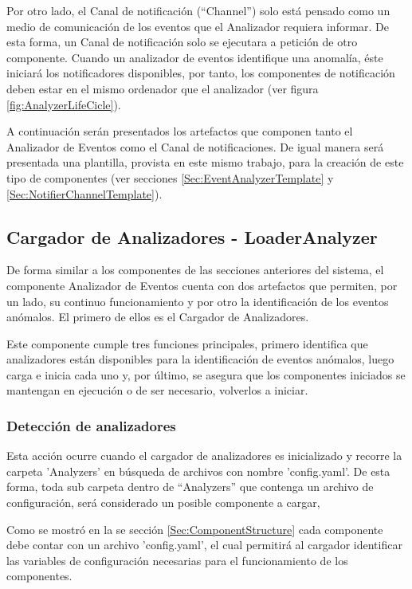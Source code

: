     Por otro lado, el Canal de notificación (``Channel'') solo está pensado como un medio de comunicación de los eventos que el Analizador requiera informar. De esta forma, un Canal de notificación solo se ejecutara a petición de otro componente. Cuando un analizador de eventos identifique una anomalía, éste iniciará los notificadores disponibles, por tanto, los componentes de notificación deben estar en el mismo ordenador que el analizador (ver figura \ref{fig:AnalyzerLifeCicle}).
    
    A continuación serán presentados los artefactos que componen tanto el Analizador de Eventos como el Canal de notificaciones. De igual manera será presentada una plantilla, provista en este mismo trabajo, para la creación de este tipo de componentes (ver secciones \ref{Sec:EventAnalyzerTemplate} y \ref{Sec:NotifierChannelTemplate}).
    
    \subsection{Cargador de Analizadores - LoaderAnalyzer}
    \label{sub:LoaderAnalyzer}
        De forma similar a los componentes de las secciones anteriores del sistema, el componente Analizador de Eventos cuenta con dos artefactos que permiten, por un lado, su continuo funcionamiento y por otro la identificación de los eventos anómalos. El primero de ellos es el Cargador de Analizadores.
    
        Este componente cumple tres funciones principales, primero identifica que analizadores están disponibles para la identificación de eventos anómalos, luego carga e inicia cada uno y, por último, se asegura que los componentes iniciados se mantengan en ejecución o de ser necesario, volverlos a iniciar.
        
        \subsubsection{Detección de analizadores}
        \label{sub2:AnalyzerDetection}
            Esta acción ocurre cuando el cargador de analizadores es inicializado y recorre la carpeta 'Analyzers' en búsqueda de archivos con nombre 'config.yaml'. De esta forma, toda sub carpeta dentro de ``Analyzers'' que contenga un archivo de configuración, será considerado un posible componente a cargar,
            
            Como se mostró en la se sección \ref{Sec:ComponentStructure} cada componente debe contar con un archivo 'config.yaml', el cual permitirá al cargador identificar las variables de configuración necesarias para el funcionamiento de los componentes.
            
